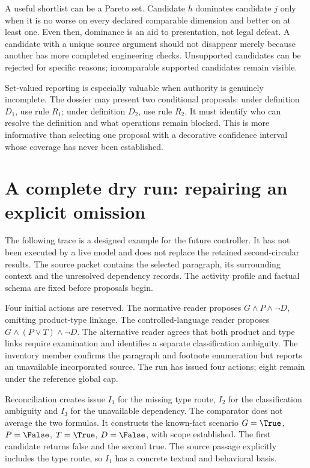 A useful shortlist can be a Pareto set. Candidate $h$ dominates candidate $j$ only
when it is no worse on every declared comparable dimension and better on at least
one. Even then, dominance is an aid to presentation, not legal defeat. A candidate
with a unique source argument should not disappear merely because another has
more completed engineering checks. Unsupported candidates can be rejected for
specific reasons; incomparable supported candidates remain visible.

Set-valued reporting is especially valuable when authority is genuinely
incomplete. The dossier may present two conditional proposals: under definition
$D_1$, use rule $R_1$; under definition $D_2$, use rule $R_2$. It must identify who
can resolve the definition and what operations remain blocked. This is more
informative than selecting one proposal with a decorative confidence interval
whose coverage has never been established.

\section{A complete dry run: repairing an explicit omission}
\label{merge:M06:20}


The following trace is a designed example for the future controller. It has not
been executed by a live model and does not replace the retained second-circular
results. The source packet contains the selected paragraph, its surrounding
context and the unresolved dependency records. The activity profile and factual
schema are fixed before proposals begin.

Four initial actions are reserved. The normative reader proposes
$G\land P\land\neg D$, omitting product-type linkage. The controlled-language
reader proposes $G\land(P\lor T)\land\neg D$. The alternative reader agrees that
both product and type links require examination and identifies a separate
classification ambiguity. The inventory member confirms the paragraph and
footnote enumeration but reports an unavailable incorporated source. The run has
issued four actions; eight remain under the reference global cap.

Reconciliation creates issue $I_1$ for the missing type route, $I_2$ for the
classification ambiguity and $I_3$ for the unavailable dependency. The comparator
does not average the two formulas. It constructs the known-fact scenario
$G=\True$, $P=\False$, $T=\True$, $D=\False$, with scope established. The first
candidate returns false and the second true. The source passage explicitly
includes the type route, so $I_1$ has a concrete textual and behavioral basis.

